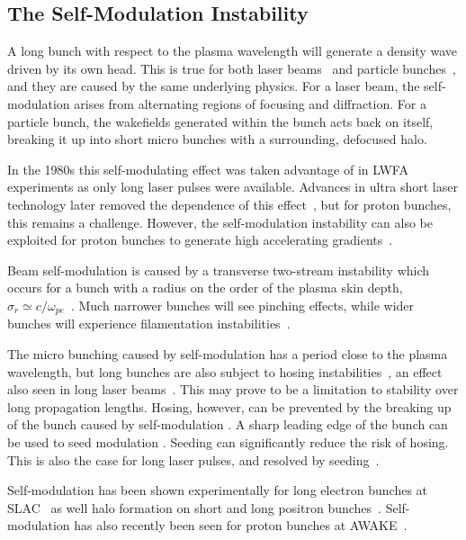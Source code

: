 \subsection{The Self-Modulation Instability}
\label{Int:DBeam:SMI}

A long bunch with respect to the plasma wavelength will generate a density wave driven by its own head.
This is true for both laser beams~\cite{esarey:1994} and particle bunches~\cite{kumar:2010}, and they are caused by the same underlying physics.
For a laser beam, the self-modulation arises from alternating regions of focusing and diffraction.
For a particle bunch, the wakefields generated within the bunch acts back on itself, breaking it up into short micro bunches with a surrounding, defocused halo.

In the 1980s this self-modulating effect was taken advantage of in LWFA experiments as only long laser pulses were available.
Advances in ultra short laser technology later removed the dependence of this effect~\cite{pukhov:2002}, but for proton bunches, this remains a challenge.
However, the self-modulation instability can also be exploited for proton bunches to generate high accelerating gradients~\cite{schroeder:2012,schroeder:2011,caldwell:2009}.

Beam self-modulation is caused by a transverse two-stream instability which occurs for a bunch with a radius on the order of the plasma skin depth, $\sigma_{r} \simeq c/\omega_{pe}$~\cite{vieira:2012}.
Much narrower bunches will see pinching effects, while wider bunches will experience filamentation instabilities~\cite{keinigs:1987}.

The micro bunching caused by self-modulation has a period close to the plasma wavelength, but long bunches are also subject to hosing instabilities~\cite{whittum:1991}, an effect also seen in long laser beams~\cite{duda:1999,duda:2000}.
This may prove to be a limitation to stability over long propagation lengths.
Hosing, however, can be prevented by the breaking up of the bunch caused by self-modulation \cite{vieira:2014}.
A sharp leading edge of the bunch can be used to seed modulation \cite{fang:2014}.
Seeding can significantly reduce the risk of hosing.
This is also the case for long laser pulses, and resolved by seeding~\cite{vieira:2012}. 

Self-modulation has been shown experimentally for long electron bunches at SLAC~\cite{muggli:2014,muggli:2015} as well halo formation on short and long positron bunches~\cite{muggli:2008,hogan:2003}.
Self-modulation has also recently been seen for proton bunches at AWAKE~\cite{muggli:2017a}.

